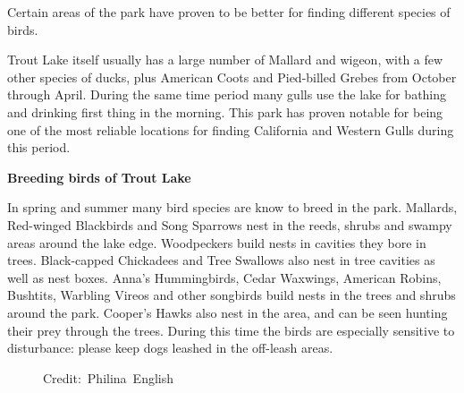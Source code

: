 Certain areas of the park have proven to be better for finding different species of birds. 

Trout Lake itself usually has a large number of Mallard and wigeon, with a few other species of ducks, plus American Coots and Pied-billed Grebes from October through April. During the same time period many gulls use the lake for bathing and drinking first thing in the morning. This park has proven notable for being one of the most reliable locations for finding California and Western Gulls during this period. 

\textbf{Breeding birds of Trout Lake}

In spring and summer many bird species are know to breed in the park. 
Mallards, Red-winged Blackbirds and Song Sparrows nest in the reeds, shrubs 
and swampy areas around the lake edge. Woodpeckers build nests in cavities they 
bore in trees. Black-capped Chickadees and Tree Swallows also nest in tree cavities 
as well as nest boxes.
Anna's Hummingbirds, Cedar Waxwings, American Robins, Bushtits, Warbling Vireos and 
other songbirds build nests in the trees and shrubs around the park. 
Cooper's Hawks also nest in the 
area, and can be seen hunting their prey through the trees. During this time the 
birds are especially sensitive to disturbance: please keep dogs leashed in the off-leash areas.


\begin{figure}[t]
  \centering
\end{figure}
\begin{figure}[h!]
  \centering
\end{figure}
\begin{figure}[b]
  \centering
  \hspace*{15pt}\hbox{\scriptsize Credit: Philina English}
\end{figure}

